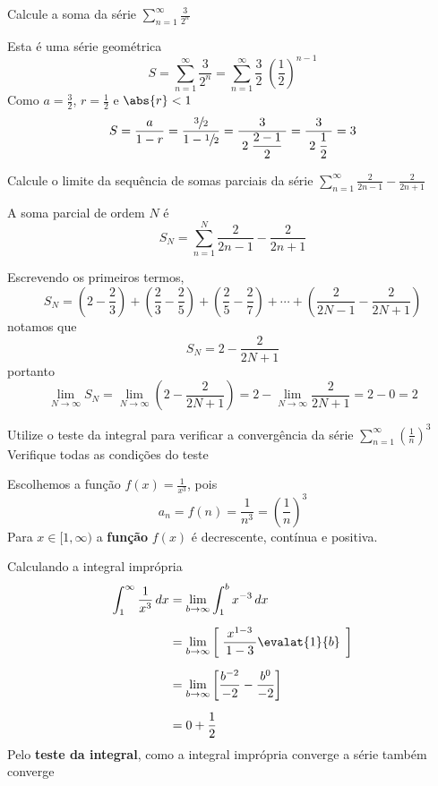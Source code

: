 \documentclass[a4paper,12pt,fleqn]{article}
\begin{document}

Calcule a soma da série
\(
  \sum_{n=1}^{\infty} \frac{3}{2^n}
\)

\begin{answer}
  Esta é uma série geométrica
  \[
    S
    = \sum_{n=1}^{\infty} \frac{3}{2^n}
    = \sum_{n=1}^{\infty} \frac{3}{2} \; \left(\frac{1}{2}\right)^{n-1}
  \]
  Como \(a = \frac{3}{2}\), \(r = \frac{1}{2}\) e \(\abs{r} < 1\)
  \[
    S
     = \frac{a}{1-r}
     = \frac{\sfrac{3}{2}}{1-\sfrac{1}{2}}
     = \frac{3}{\;2\; \dfrac{2-1}{2}\;}
     = \frac{3}{\;2\; \dfrac{1}{2}\;}
     = 3
  \]
\end{answer}

Calcule o limite da sequência de somas parciais da série
\(
  \sum_{n=1}^{\infty} \frac{2}{2n-1} - \frac{2}{2n+1}
\)

\begin{answer}
  A soma parcial de ordem \(N\) é
  \[
    S_N = \sum_{n=1}^{N} \frac{2}{2n-1} - \frac{2}{2n+1}
  \]

  Escrevendo os primeiros termos,
  \[
    S_N
    = \left(       2        - \frac{2}{3}    \right)
    + \left( \frac{2}{3}    - \frac{2}{5}    \right)
    + \left( \frac{2}{5}    - \frac{2}{7}    \right) + \cdots
    + \left( \frac{2}{2N-1} - \frac{2}{2N+1} \right)
  \]
  notamos que
  \[
    S_N = 2 - \frac{2}{2N+1}
  \]
  portanto
  \[
    \lim_{N\to\infty} S_N
    = \lim_{N\to\infty} \left(2 - \frac{2}{2N+1}\right)
    = 2 - \lim_{N\to\infty} \frac{2}{2N+1}
    = 2 - 0
    = 2
  \]
\end{answer}

Utilize o teste da integral para verificar a convergência da série
\(
  \sum_{n=1}^{\infty} \left(\frac{1}{n}\right)^3
\)\\
Verifique todas as condições do teste

\begin{answer}
  Escolhemos a função \(f(x) = \frac{1}{x^3}\), pois
  \[
    a_n = f(n) = \frac{1}{n^3} = \left(\frac{1}{n}\right)^3
  \]
  Para $x\in[1, \infty)$ a \textbf{função} $f(x)$ é decrescente, contínua e positiva.

  Calculando a integral imprópria
  \begin{align*}
    \int_{1}^{\infty} \frac{1}{x^3}\,dx
    & = \lim_{b\to\infty} \int_{1}^{b} x^{-3}\,dx                                       \\[2mm]
    & = \lim_{b\to\infty} \left[ \;\frac{\,x^{1-3}\,}{\,1-3\,}\evalat{1}{b}\;\, \right] \\[2mm]
    & = \lim_{b\to\infty} \left[ \frac{b^{-2}}{-2} - \frac{b^0}{-2} \right]             \\[2mm]
    & = 0 + \frac{1}{2}
  \end{align*}
  Pelo \textbf{teste da integral}, como a integral imprópria converge a série também converge
\end{answer}
\end{document}
